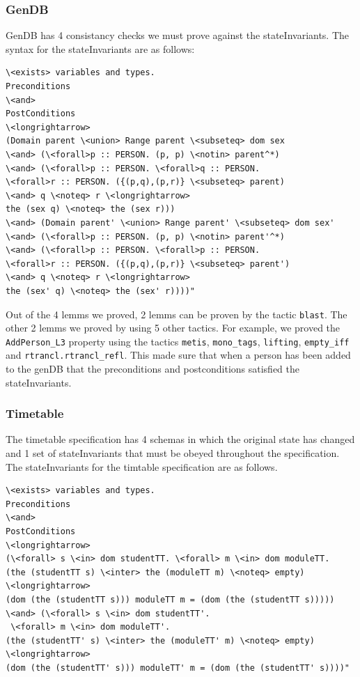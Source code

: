 \subsubsection{GenDB}

GenDB has 4 consistancy checks we must prove against the stateInvariants. The syntax for the stateInvariants are as follows:

\begin{verbatim}
\<exists> variables and types.
Preconditions
\<and>
PostConditions
\<longrightarrow>
(Domain parent \<union> Range parent \<subseteq> dom sex
\<and> (\<forall>p :: PERSON. (p, p) \<notin> parent^*)
\<and> (\<forall>p :: PERSON. \<forall>q :: PERSON.
\<forall>r :: PERSON. ({(p,q),(p,r)} \<subseteq> parent)
\<and> q \<noteq> r \<longrightarrow>
the (sex q) \<noteq> the (sex r)))
\<and> (Domain parent' \<union> Range parent' \<subseteq> dom sex'
\<and> (\<forall>p :: PERSON. (p, p) \<notin> parent'^*)
\<and> (\<forall>p :: PERSON. \<forall>p :: PERSON.
\<forall>r :: PERSON. ({(p,q),(p,r)} \<subseteq> parent')
\<and> q \<noteq> r \<longrightarrow>
the (sex' q) \<noteq> the (sex' r))))"
\end{verbatim}

Out of the 4 lemms we proved, 2 lemms can be proven by the tactic \verb|blast|. The other 2 lemms we proved by using 5 other tactics. For example, we proved the \verb|AddPerson_L3| property using the tactics \verb|metis|, \verb|mono_tags|, \verb|lifting|, \verb|empty_iff| and \verb|rtrancl.rtrancl_refl|. This made sure that when a person has been added to the genDB that the preconditions and postconditions satisfied the stateInvariants.

\subsubsection{Timetable}

The timetable specification has 4 schemas in which the original state has changed and 1 set of stateInvariants that must be obeyed throughout the specification. The stateInvariants for the timtable specification are as follows.

\begin{verbatim}
\<exists> variables and types.
Preconditions
\<and>
PostConditions
\<longrightarrow>
(\<forall> s \<in> dom studentTT. \<forall> m \<in> dom moduleTT.
(the (studentTT s) \<inter> the (moduleTT m) \<noteq> empty)
\<longrightarrow>
(dom (the (studentTT s))) moduleTT m = (dom (the (studentTT s)))))
\<and> (\<forall> s \<in> dom studentTT'.
 \<forall> m \<in> dom moduleTT'.
(the (studentTT' s) \<inter> the (moduleTT' m) \<noteq> empty)
\<longrightarrow>
(dom (the (studentTT' s))) moduleTT' m = (dom (the (studentTT' s))))"
\end{verbatim}

